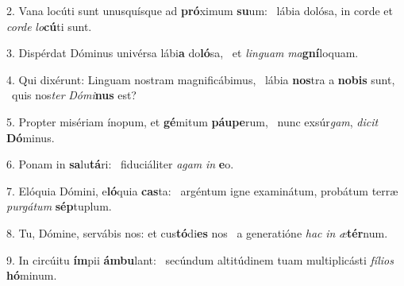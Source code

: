 2. Vana locúti sunt unusquísque ad \textbf{pró}ximum \textbf{su}um: \ast\  lábia dolósa, in corde et \textit{cor}\textit{de} \textit{lo}\textbf{cú}ti sunt.\

3. Dispérdat Dóminus univérsa lábi\textbf{a} do\textbf{ló}sa, \ast\  et \textit{lin}\textit{guam} \textit{ma}\textbf{gní}loquam.\

4. Qui dixérunt: Linguam nostram magnificábimus, \dag\  lábia \textbf{nos}tra a \textbf{no}\textbf{bis} sunt, \ast\  quis nos\textit{ter} \textit{Dó}\textit{mi}\textbf{nus} est?\

5. Propter misériam ínopum, et \textbf{gé}mitum \textbf{páu}\textbf{pe}rum, \ast\  nunc exsúr\textit{gam}, \textit{di}\textit{cit} \textbf{Dó}minus.\

6. Ponam in \textbf{sa}lu\textbf{tá}ri: \ast\  fiduciáliter \textit{a}\textit{gam} \textit{in} \textbf{e}o.\

7. Elóquia Dómini, e\textbf{ló}quia \textbf{cas}ta: \ast\  argéntum igne examinátum, probátum terræ \textit{pur}\textit{gá}\textit{tum} \textbf{sép}tuplum.\

8. Tu, Dómine, servábis nos: et cus\textbf{tó}di\textbf{es} nos \ast\  a generatióne \textit{hac} \textit{in} \textit{æ}\textbf{tér}num.\

9. In circúitu \textbf{ím}pii \textbf{ám}\textbf{bu}lant: \ast\  secúndum altitúdinem tuam multiplicásti \textit{fí}\textit{li}\textit{os} \textbf{hó}minum.\

